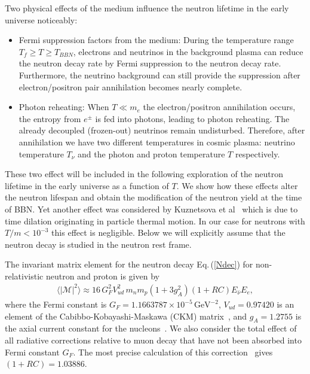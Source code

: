 Two physical effects of the medium  influence the neutron lifetime in the early universe noticeably:
\begin{itemize}
\item Fermi suppression factors from the medium: 
During the temperature range $T_f\geqslant T\geqslant T_{BBN}$, electrons and neutrinos in the background plasma can reduce the neutron decay rate by Fermi suppression to the neutron decay rate. Furthermore, the neutrino background can still provide the suppression after electron/positron pair annihilation becomes nearly complete.
\item Photon reheating:
When $T\ll m_e$ the electron/positron annihilation occurs, the entropy from $e^\pm$ is fed into photons, leading to photon reheating. The already decoupled (frozen-out) neutrinos remain undisturbed. Therefore, after annihilation we have two different temperatures in cosmic plasma: neutrino temperature $T_\nu$ and the photon and proton temperature $T$ respectively.
\end{itemize}
These two effect will be included in the following exploration of the neutron lifetime in the early universe as a function of $T$. We show how these effects alter the neutron lifespan and obtain the modification of the neutron yield at the time of BBN. Yet another effect was considered by Kuznetsova et al~\cite{Kuznetsova:2010pi} which is due to time dilation originating in particle thermal motion. In our case for neutrons with $T/m<10^{-3}$ this effect is negligible. Below we will explicitly assume that the neutron decay is studied in the neutron rest frame.


The invariant matrix element for the neutron decay Eq.\,(\ref{Ndec}) for non-relativistic neutron and proton is given by
\begin{align}
\langle|\mathcal{M}|^2\rangle\approx16\,G^2_FV^2_{ud}\,m_nm_p(1+3g^2_A)(1+RC)E_{\bar{\nu}}E_e,
\end{align}
where the Fermi constant is $G_F=1.1663787\times10^{-5}\,\mathrm{GeV}^{-2}$, $V_{ud}=0.97420$ is an element of the Cabibbo-Kobayashi-Maskawa (CKM) matrix~\cite{Czarnecki:2018okw,Marciano:2005ec,Czarnecki:2004cw}, and $g_A=1.2755$ is the axial current constant for the nucleons~\cite{Czarnecki:2018okw,Marciano:2014ria}. We also consider the total effect of all radiative corrections relative to muon decay that have not been absorbed into Fermi constant $G_F$. The most precise calculation of this correction~\cite{Marciano:2014ria,Marciano:2005ec} gives $(1+RC)=1.03886$. 

